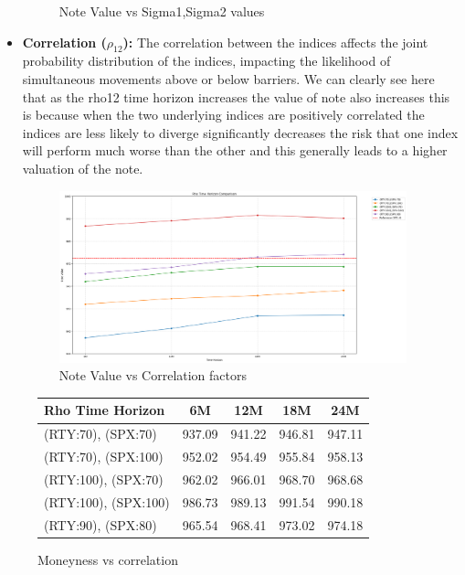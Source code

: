 \documentclass[12pt,a4paper]{article}
\begin{document}
\begin{itemize}
\begin{figure}[H]
	    \caption{Note Value vs Sigma1,Sigma2 values}
	    \label{fig:yourlabel}
	\end{figure}
    \item \textbf{Correlation (\( \rho_{12} \)):} The correlation between the indices affects the joint probability distribution of the indices, impacting the likelihood of simultaneous movements above or below barriers. We can clearly see here that as the rho12 time horizon increases the value of note also increases this is because when the two underlying indices are positively correlated the indices are less likely to diverge significantly decreases the risk that one index will perform much worse than the other and this generally leads to a higher valuation of the note.
	\begin{figure}[H]
	    \centering
	    \includegraphics[width=0.95\textwidth, keepaspectratio]{images_project_2/note_val_rho.png}
	    \caption{Note Value vs Correlation factors}
	    \label{fig:yourlabel}
	\end{figure}
\end{itemize}

\begin{figure}[htbp]
\centering
\renewcommand{\arraystretch}{1.2}  %
\setlength{\tabcolsep}{15pt}      %
\begin{tabular}{|l|r|r|r|r|}
\hline
\rowcolor{cyan!15}\bf Rho Time Horizon & \multicolumn{1}{c|}{\bf 6M} & \multicolumn{1}{c|}{\bf 12M} & \multicolumn{1}{c|}{\bf 18M} & \multicolumn{1}{c|}{\bf 24M} \\
\hline
(RTY:70), (SPX:70) & 937.09 & 941.22 & 946.81 & 947.11 \\
\hline
(RTY:70), (SPX:100) & 952.02 & 954.49 & 955.84 & 958.13 \\
\hline
(RTY:100), (SPX:70) & 962.02 & 966.01 & 968.70 & 968.68 \\
\hline
(RTY:100), (SPX:100) & 986.73 & 989.13 & 991.54 & 990.18 \\
\hline
(RTY:90), (SPX:80) & 965.54 & 968.41 & 973.02 & 974.18 \\
\hline
\end{tabular}
\caption{Moneyness vs correlation}
\label{fig:moneyness_correlation}
\end{figure}
\end{document}
